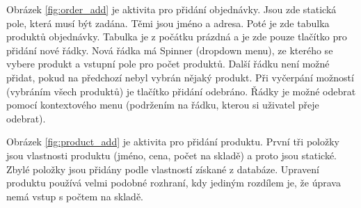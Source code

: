 \documentclass[12pt]{report}
\begin{document}
Obrázek \ref{fig:order_add} je aktivita pro přidání objednávky. Jsou zde statická pole, která musí být zadána.
Těmi jsou jméno a adresa. Poté je zde tabulka produktů objednávky. Tabulka je z počátku prázdná a je zde
pouze tlačítko pro přidání nové řádky. Nová řádka má Spinner (dropdown menu), ze kterého se vybere produkt a
vstupní pole pro počet produktů. Další řádku není možné přidat, pokud na předchozí nebyl vybrán nějaký produkt.
Při vyčerpání možností (vybráním všech produktů) je tlačítko přidání odebráno. Řádky je možné odebrat pomocí
kontextového menu (podržením na řádku, kterou si uživatel přeje odebrat).

Obrázek \ref{fig:product_add} je aktivita pro přidání produktu. První tři položky jsou vlastnosti produktu
(jméno, cena, počet na skladě) a proto jsou statické. Zbylé položky jsou přidány podle vlastností získané 
z databáze. Upravení produktu používá velmi podobné rozhraní, kdy jediným rozdílem je, že úprava nemá vstup
s počtem na skladě.
%
\end{document}
